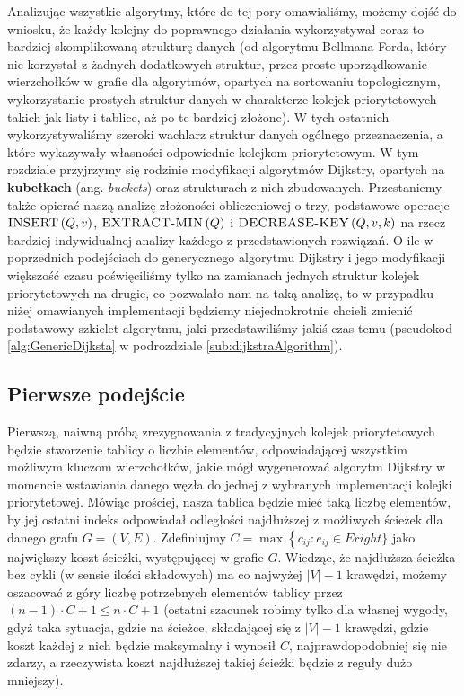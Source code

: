 Analizując wszystkie algorytmy, które do tej pory omawialiśmy, możemy dojść do wniosku, że każdy kolejny do poprawnego działania wykorzystywał coraz to bardziej skomplikowaną strukturę danych (od algorytmu Bellmana-Forda, który nie korzystał z żadnych dodatkowych struktur, przez proste uporządkowanie wierzchołków w grafie dla algorytmów, opartych na sortowaniu topologicznym, wykorzystanie prostych struktur danych w charakterze kolejek priorytetowych takich jak listy i tablice, aż po te bardziej złożone). W tych ostatnich wykorzystywaliśmy szeroki wachlarz struktur danych ogólnego przeznaczenia, a które wykazywały własności odpowiednie kolejkom priorytetowym. W tym rozdziale przyjrzymy się rodzinie modyfikacji algorytmów Dijkstry, opartych na \textbf{kubełkach} (ang. \textit{buckets}) oraz strukturach z nich zbudowanych. Przestaniemy także opierać naszą analizę złożoności obliczeniowej o trzy, podstawowe operacje $\textrm{\textsc{INSERT}} \left( Q, v \right)$, $\textrm{\textsc{EXTRACT-MIN}} \left( Q \right)$ i $\textrm{\textsc{DECREASE-KEY}} \left( Q, v, k \right)$ na rzecz bardziej indywidualnej analizy każdego z przedstawionych rozwiązań. O ile w poprzednich podejściach do  generycznego algorytmu Dijkstry i jego modyfikacji większość czasu poświęciliśmy tylko na zamianach jednych struktur kolejek priorytetowych na drugie, co pozwalało nam na taką analizę, to w przypadku niżej omawianych implementacji będziemy niejednokrotnie chcieli zmienić podstawowy szkielet algorytmu, jaki przedstawiliśmy jakiś czas temu (pseudokod \ref{alg:GenericDijksta} w podrozdziale \ref{sub:dijkstraAlgorithm}).

\subsection{Pierwsze podejście}

Pierwszą, naiwną próbą zrezygnowania z tradycyjnych kolejek priorytetowych będzie stworzenie tablicy o liczbie elementów, odpowiadającej wszystkim możliwym kluczom wierzchołków, jakie mógł wygenerować algorytm Dijkstry w momencie wstawiania danego węzła do jednej z wybranych implementacji kolejki priorytetowej. Mówiąc prościej, nasza tablica będzie mieć taką liczbę elementów, by jej ostatni indeks odpowiadał odległości najdłuższej z możliwych ścieżek dla danego grafu $G = \left( V, E \right)$. Zdefiniujmy $C = \max \left\{ c_{ij} : e_{ij} \in E right\}$ jako największy koszt ścieżki, występującej w grafie $G$. Wiedząc, że najdłuższa ścieżka bez cykli (w sensie ilości składowych) ma co najwyżej $ \left| V \right| - 1 $ krawędzi, możemy oszacować z góry liczbę potrzebnych elementów tablicy przez $ \left( n - 1 \right) \cdot C + 1 \leqslant n \cdot C + 1$ (ostatni szacunek robimy tylko dla własnej wygody, gdyż taka sytuacja, gdzie na ścieżce, składającej się z $ \left| V \right| - 1 $ krawędzi, gdzie koszt każdej z nich będzie maksymalny i wynosił $C$, najprawdopodobniej się nie zdarzy, a rzeczywista koszt najdłuższej takiej ścieżki będzie z reguły dużo mniejszy).


